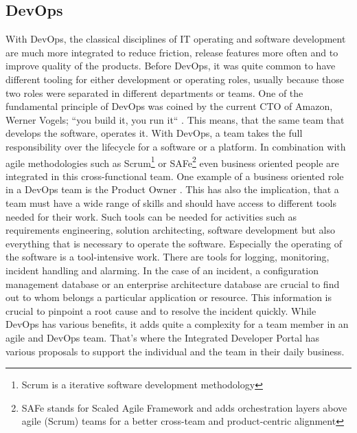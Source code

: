 \documentclass[a4paper,12pt]{article}
\begin{document}
    \subsection{DevOps}
    \label{subsec:devops}
    With DevOps, the classical disciplines of IT operating and software development are much more integrated to reduce
    friction, release features more often and to improve quality of the products\parencite{safedevops}.
    Before DevOps, it was quite common to have different tooling for either development or operating roles, usually
    because those two roles were separated in different departments or teams.
    One of the fundamental principle of DevOps was coined by the current CTO of Amazon, Werner Vogels;
    ``you build it, you run it``\parencite{vogels} .
    This means, that the same team that develops the software, operates it.
    With DevOps, a team takes the full responsibility over the lifecycle for a software or a platform.
    In combination with agile methodologies such as Scrum\footnote{Scrum is a iterative software development methodology}
    or SAFe\footnote{SAFe stands for Scaled Agile Framework and adds orchestration layers above agile (Scrum) teams for
    a better cross-team and product-centric alignment} even business oriented people are integrated in this
    cross-functional team.
    One example of a business oriented role in a DevOps team is the Product Owner\parencite{safepo} .
    This has also the implication, that a team must have a wide range of skills and should have access to different
    tools needed for their work.
    Such tools can be needed for activities such as requirements engineering, solution architecting, software development
    but also everything that is necessary to operate the software.
    Especially the operating of the software is a tool-intensive work.
    There are tools for logging, monitoring, incident handling and alarming.
    In the case of an incident, a configuration management database or an enterprise architecture database are crucial
    to find out to whom belongs a particular application or resource.
    This information is crucial to pinpoint a root cause and to resolve the incident quickly.
    While DevOps has various benefits, it adds quite a complexity for a team member in an agile and DevOps team.
    That's where the Integrated Developer Portal has various proposals to support the individual and the team in their
    daily business.
\end{document}
